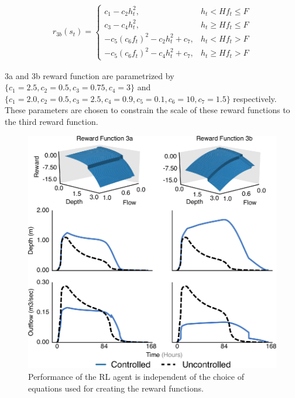 \begin{align}
  r_{3b} (s_t) = \left\{ \begin{array}{ll}
    c_1 - c_2 h_t^2, & h_t < Hf_t \leq F\\
    c_3 - c_4 h_t^2, & h_t \geq Hf_t \leq F\\
    - c_5 {(c_6 f_t)}^2 - c_2 h_t^2 + c_7, & h_t < Hf_t > F\\
    - c_5 {(c_6 f_t)}^2 - c_4 h_t^2 + c_7, & h_t \geq Hf_t > F
  \end{array} \right.\label{third2}
\end{align}

3a and 3b reward function are parametrized by $\{ c_1 = 2.5, c_2 = 0.5, c_3 = 0.75, c_4=3\}$ and $\{c_1 =2.0, c_2 = 0.5, c_3 = 2.5, c_4 = 0.9, c_5=0.1, c_6=10, c_7 = 1.5\}$ respectively.
These parameters are chosen to constrain the scale of these reward functions to the third reward function.

\begin{figure}[H]
    \centering
    \includegraphics[width=0.6\linewidth]{gfx/Chapter-3/new_reward.eps}
    \caption{Performance of the RL agent is independent of the choice of equations used for creating the reward functions.}\label{fig:new_reward_math}
\end{figure}

\newpage 

